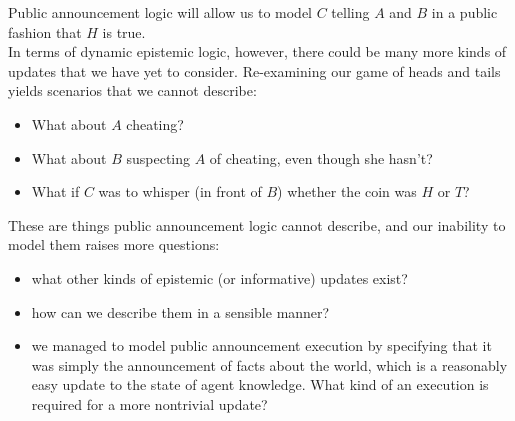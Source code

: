 \documentclass[10pt, a4paper, twoside]{article}
\begin{document}
Public announcement logic will allow us to model $C$ telling $A$ and $B$ in a
public fashion that $H$ is true.
\\
In terms of dynamic epistemic logic, however, there could be many more kinds of
updates that we have yet to consider.
Re-examining our game of heads and tails yields scenarios that we cannot
describe:
\begin{itemize}
	\item What about $A$ cheating?
	\item What about $B$ suspecting $A$ of cheating, even though she hasn't?
	\item What if $C$ was to whisper (in front of $B$) whether the coin was $H$
	or $T$?
\end{itemize}
These are things public announcement logic cannot describe, and our inability to
model them raises more questions:
\begin{itemize}
	\item what other kinds of epistemic (or informative) updates exist?
	\item how can we describe them in a sensible manner?
	\item we managed to model public announcement execution by specifying that it
	was simply the announcement of facts about the world, which is a reasonably
	easy update to the state of agent knowledge. What kind of an execution is
	required for a more nontrivial update?
\end{itemize}
\end{document}
